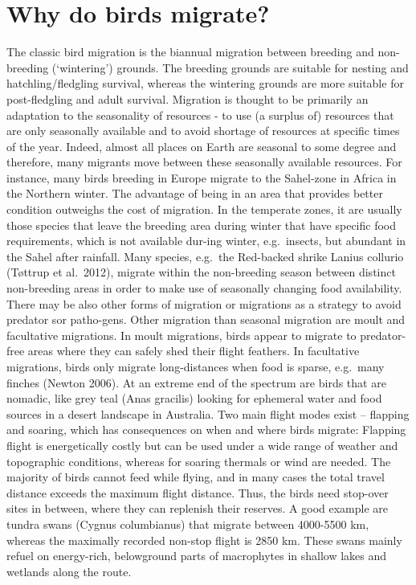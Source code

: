\documentclass[
]{book}
\begin{document}
\hypertarget{why-do-birds-migrate}{%
\section{Why do birds migrate?}\label{why-do-birds-migrate}}

The classic bird migration is the biannual migration between breeding and non-breeding (`wintering') grounds. The breeding grounds are suitable for nesting and hatchling/fledgling survival, whereas the wintering grounds are more suitable for post-fledgling and adult survival. Migration is thought to be primarily an adaptation to the seasonality of resources - to use (a surplus of) resources that are only seasonally available and to avoid shortage of resources at specific times of the year.
Indeed, almost all places on Earth are seasonal to some degree and therefore, many migrants move between these seasonally available resources. For instance, many birds breeding in Europe migrate to the Sahel-zone in Africa in the Northern winter. The advantage of being in an area that provides better condition outweighs the cost of migration. In the temperate zones, it are usually those species that leave the breeding area during winter that have specific food requirements, which is not available dur-ing winter, e.g.~insects, but abundant in the Sahel after rainfall. Many species, e.g.~the Red-backed shrike Lanius collurio (Tøttrup et al.~2012), migrate within the non-breeding season between distinct non-breeding areas in order to make use of seasonally changing food availability.\\
There may be also other forms of migration or migrations as a strategy to avoid predator sor patho-gens.
Other migration than seasonal migration are moult and facultative migrations. In moult migrations, birds appear to migrate to predator-free areas where they can safely shed their flight feathers. In facultative migrations, birds only migrate long-distances when food is sparse, e.g.~many finches (Newton 2006). At an extreme end of the spectrum are birds that are nomadic, like grey teal (Anas gracilis) looking for ephemeral water and food sources in a desert landscape in Australia.
Two main flight modes exist -- flapping and soaring, which has consequences on when and where birds migrate: Flapping flight is energetically costly but can be used under a wide range of weather and topographic conditions, whereas for soaring thermals or wind are needed.
The majority of birds cannot feed while flying, and in many cases the total travel distance exceeds the maximum flight distance. Thus, the birds need stop-over sites in between, where they can replenish their reserves. A good example are tundra swans (Cygnus columbianus) that migrate between 4000-5500 km, whereas the maximally recorded non-stop flight is 2850 km. These swans mainly refuel on energy-rich, belowground parts of macrophytes in shallow lakes and wetlands along the route.
\end{document}

